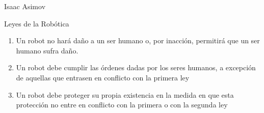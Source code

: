 
\begin{frame}[fragile]{ Isaac Asimov }
\vspace{10px}
\pause
{}
\begin{block}{Leyes de la Robótica}
	\begin{enumerate}
		\item Un robot no hará da\~no a un ser humano o, por inacción, permitirá que un ser humano sufra da\~no.
		\pause
		\item Un robot debe cumplir las órdenes dadas por los seres humanos, a excepción de aquellas que entrasen en conflicto con la primera ley
		\pause
		\item Un robot debe proteger su propia existencia en la medida en que esta protección no entre en conflicto con la primera o con la segunda ley
	\end{enumerate}
\end{block}
\end{frame}


